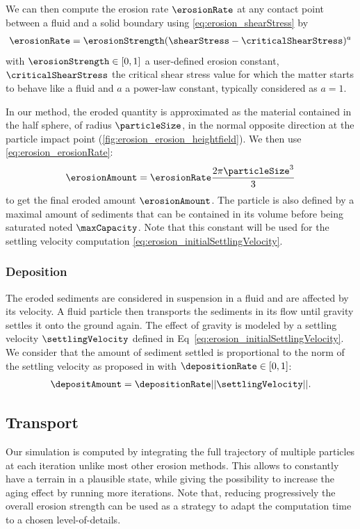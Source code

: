 We can then compute the erosion rate $\erosionRate$ at any contact point between a fluid and a solid boundary using \eqref{eq:erosion_shearStress} by 
\begin{align}\label{eq:erosion_erosionRate}
\erosionRate = \erosionStrength (\shearStress - \criticalShearStress)^a
\end{align}
with $\erosionStrength \in [0,1]$ a user-defined erosion constant, $\criticalShearStress$ the critical shear stress value for which the matter starts to behave like a fluid and $a$ a power-law constant, typically considered as $a = 1$. 

In our method, the eroded quantity is approximated as the material contained in the half sphere, of radius $\particleSize$, in the normal opposite direction at the particle impact point (\cref{fig:erosion_erosion_heightfield}). We then use \eqref{eq:erosion_erosionRate}: 
\begin{align}\label{eq:erosion_erosionAmount} 
\erosionAmount = \erosionRate \frac{ 2 \pi \particleSize^3 }{ 3 }
\end{align}
to get the final eroded amount $\erosionAmount$. The particle is also defined by a maximal amount of sediments that can be contained in its volume before being saturated noted $\maxCapacity$. Note that this constant will be used for the settling velocity computation \eqref{eq:erosion_initialSettlingVelocity}.

\subsubsection{Deposition}
The eroded sediments are considered in suspension in a fluid and are affected by its velocity. A fluid particle then transports the sediments in its flow until gravity settles it onto the ground again. The effect of gravity is modeled by a settling velocity $\settlingVelocity$ defined in Eq~\eqref{eq:erosion_initialSettlingVelocity}. We consider that the amount of sediment settled is proportional to the norm of the settling velocity as proposed in \cite{Wojtan2007} with $\depositionRate \in [0,1]$: 
\begin{align}\label{eq:erosion_deltaDepositon}
\depositAmount = \depositionRate ||\settlingVelocity||.
\end{align}


\subsection{Transport}
Our simulation is computed by integrating the full trajectory of multiple particles at each iteration unlike most other erosion methods. This allows to constantly have a terrain in a plausible state, while giving the possibility to increase the aging effect by running more iterations. 
Note that, reducing progressively the overall erosion strength can be used as a strategy to adapt the computation time to a chosen level-of-details.

